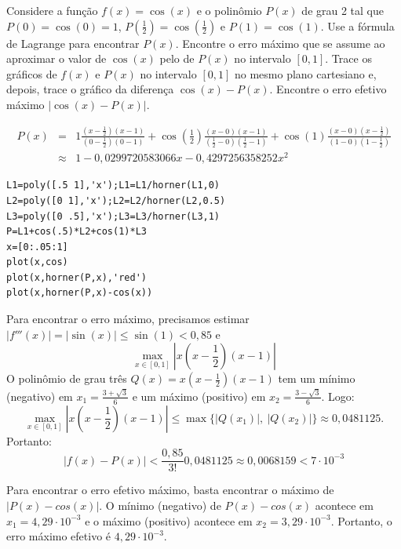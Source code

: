 \begin{ex}
Considere a função $f(x)=\cos(x)$ e o polinômio $P(x)$ de grau 2 tal que $P(0)=\cos(0)=1$, $P(\frac{1}{2})=\cos(\frac{1}{2})$ e $P(1)=\cos(1)$. Use a fórmula de Lagrange para encontrar $P(x)$. Encontre o erro máximo que se assume ao aproximar o valor de $\cos(x)$ pelo de $P(x)$ no intervalo $[0,1]$. Trace os gráficos de $f(x)$ e $P(x)$ no intervalo $[0,1]$ no mesmo plano cartesiano e, depois, trace o gráfico da diferença $\cos(x)-P(x)$. Encontre o erro efetivo máximo $|\cos(x)-P(x)|$.
\end{ex}

\begin{eqnarray*}
P(x)&=&1\frac{(x-\frac{1}{2})(x-1)}{(0-\frac{1}{2})(0-1)}+\cos\left(\frac{1}{2}\right)\frac{(x-0)(x-1)}{(\frac{1}{2}-0)(\frac{1}{2}-1)}+\cos(1)\frac{(x-0)(x-\frac{1}{2})}{(1-0)(1-\frac{1}{2})}\\
&\approx&   1 - 0,0299720583066x - 0,4297256358252x^2
\end{eqnarray*}

\ifisscilab
\begin{verbatim}
L1=poly([.5 1],'x');L1=L1/horner(L1,0)
L2=poly([0 1],'x');L2=L2/horner(L2,0.5)
L3=poly([0 .5],'x');L3=L3/horner(L3,1)
P=L1+cos(.5)*L2+cos(1)*L3
x=[0:.05:1]
plot(x,cos)
plot(x,horner(P,x),'red')
plot(x,horner(P,x)-cos(x))
\end{verbatim}
\fi

Para encontrar o erro máximo, precisamos estimar $|f'''(x)|=|\sin(x)|\leq \sin(1)<0,85$ e
$$
\max_{x\in[0,1]} \left|x\left(x-\frac{1}{2}\right)(x-1)\right|
$$
O polinômio de grau três $Q(x)=x\left(x-\frac{1}{2}\right)(x-1)$ tem um mínimo (negativo) em $x_1=\frac{3+\sqrt{3}}{6}$ e um máximo (positivo) em $x_2=\frac{3-\sqrt{3}}{6}$. Logo:
$$
\max_{x\in[0,1]} \left|x\left(x-\frac{1}{2}\right)(x-1)\right|\leq \max\{|Q(x_1)|,\ |Q(x_2)|\}\approx 0,0481125.
$$
Portanto:
$$
|f(x)-P(x)|< \frac{0,85}{3!}0,0481125\approx 0,0068159<7\cdot 10^{-3}
$$

Para encontrar o erro efetivo máximo, basta encontrar o máximo de $|P(x)-cos(x)|$. O mínimo (negativo) de $P(x)-cos(x)$ acontece em $x_1=4,29\cdot 10^{-3}$ e o máximo (positivo) acontece em $x_2=3,29\cdot 10^{-3}$. Portanto, o erro máximo efetivo é $4,29\cdot 10^{-3}$.


